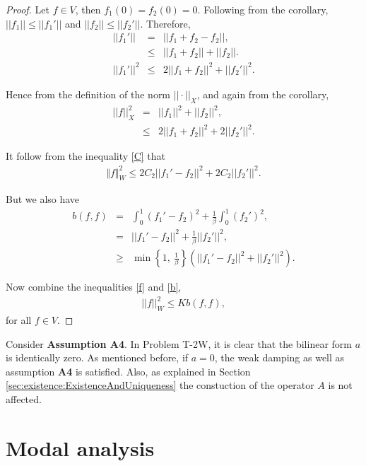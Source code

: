\documentclass[../../main.tex]{subfiles}
\begin{document}
\begin{proof}
	Let $f \in V$, then $f_1(0) = f_2(0) = 0$. Following from the corollary, $||f_1|| \leq ||f_1'||$ and $||f_2|| \leq ||f_2'||$. Therefore,
	\begin{eqnarray*}
		||f_1'|| & = & ||f_1 + f_2 - f_2||,\\
				 & \leq & ||f_1 + f_2|| + ||f_2||.\\
		||f_1'||^2 & \leq & 2||f_1 + f_2||^2 +||f_2'||^2.
	\end{eqnarray*}
	
	Hence from the definition of the norm $||\cdot||_X$, and again from the corollary,
	\begin{eqnarray*}
		||f||_X^2 & = & ||f_1||^2 + ||f_2||^2,\\
				  & \leq & 2||f_1 + f_2||^2 + 2||f_2'||^2.
	\end{eqnarray*}

	It follow from the inequality \eqref{C} that
	\begin{eqnarray}
		\Vert f \Vert_{W}^2 \leq 2C_2||f_1'-f_2||^2 + 2C_2||f_2'||^2. \label{f}
	\end{eqnarray}

	But we also have
	\begin{eqnarray}
		b(f,f) & = &   \int_0^1 (f_1'-f_2)^2 + \frac{1}{\beta}\int_0^1  (f_2')^2, \nonumber\\
		& = & ||f_1' - f_2||^2 + \frac{1}{\beta}||f_2'||^2, \nonumber\\
		& \geq & \min\left\{1 ,\ \frac{1}{\beta} \right\} \left( ||f_1' - f_2||^2 + ||f_2'||^2\right). \label{b}
	\end{eqnarray}

	Now combine the inequalities \eqref{f} and \eqref{b},
	\begin{eqnarray*}
		||f||_W^2 \leq Kb(f,f),
	\end{eqnarray*} for all $f \in V$.
\end{proof}


Consider \textbf{Assumption A4}. In Problem T-2W, it is clear that the bilinear form $a$ is identically zero. As mentioned before, if $a = 0$, the weak damping as well as assumption \textbf{A4} is satisfied. Also, as explained in Section \ref{sec:existence:ExistenceAndUniqueness} the constuction of the operator $A$ is not affected.


\section{Modal analysis}\label{sec:existence:ModalAnalysis}
\end{document}
